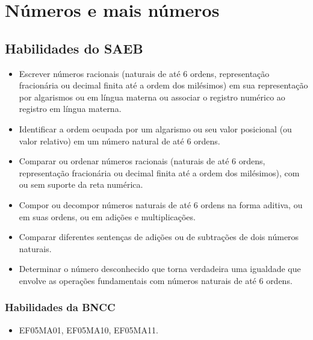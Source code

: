 \chapter{Números e mais números}

\vspace*{-1.3cm}
\enlargethispage{4\baselineskip}

\section*{Habilidades do SAEB}

\begin{itemize}
\item Escrever números racionais (naturais de até 6 ordens, representação
fracionária ou decimal finita até a ordem dos milésimos) em sua
representação por algarismos ou em língua materna ou associar o registro
numérico ao registro em língua materna.

\item Identificar a ordem ocupada por um algarismo ou seu valor posicional
(ou valor relativo) em um número natural de até 6 ordens.

\item Comparar ou ordenar números racionais (naturais de até 6 ordens,
representação fracionária ou decimal finita até a ordem dos milésimos),
com ou sem suporte da reta numérica.

\item Compor ou decompor números naturais de até 6 ordens na forma aditiva,
ou em suas ordens, ou em adições e multiplicações.

\item Comparar diferentes sentenças de adições ou de subtrações de dois números naturais.

\item Determinar o número desconhecido que torna verdadeira uma igualdade
que envolve as operações fundamentais com números naturais de até 6
ordens.
\end{itemize}

\subsection{Habilidades da BNCC}

\begin{itemize}
\item EF05MA01, EF05MA10, EF05MA11.
\end{itemize}

